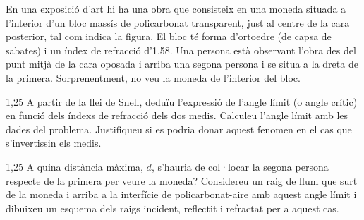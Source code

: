 En una exposició d'art hi ha una obra que consisteix en una moneda situada a l'interior d'un bloc massís de policarbonat transparent, just al centre de la cara posterior, tal com indica la figura. El bloc té forma d'ortoedre (de capsa de sabates) i un índex de refracció d'1,58. Una persona està observant l'obra des del punt mitjà de la cara oposada i arriba una segona persona i se situa a la dreta de la primera. Sorprenentment, no veu la moneda de l'interior del bloc.


\begin{apartat}{1,25}
A partir de la llei de Snell, deduïu l'expressió de l'angle límit (o angle crític) en funció dels índexs de refracció dels dos medis. Calculeu l'angle límit amb les dades del problema. Justifiqueu si es podria donar aquest fenomen en el cas que s'invertissin els medis.
\end{apartat}

\begin{apartat}{1,25}
A quina distància màxima, $d$, s'hauria de col·locar la segona persona respecte de la primera per veure la moneda? Considereu un raig de llum que surt de la moneda i arriba a la interfície de policarbonat-aire amb aquest angle límit i dibuixeu un esquema dels raigs incident, reflectit i refractat per a aquest cas.
\end{apartat}

